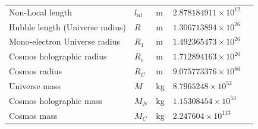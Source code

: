 \documentclass[a4paper,9pt]{article}
\begin{document}
\begin{table}
\begin{tabular}{lllll}
   Non-Local length & $l_{nl}$ & m & $2.878184911 \times 10^{12} $ & \cite{Sanchez2} \\ 
   
    Hubble length (Universe radius) & $R$ & m & $1.306713894 \times 10^{26} $ & \cite{Sanchez2} \\ 
   Mono-electron Universe radius & $R_1$ & m & $1.492365473 \times 10^{26} $ & \cite{Sanchez2} \\ 
   Cosmos holographic radius & $R_e$ & m & $1.712894163 \times 10^{26} $ & \cite{Sanchez2} \\
   Cosmos radius & $ R_C$ & m & $9.075773376 \times 10^{86} $ & \cite{Sanchez2} \\
   Universe mass & $M$ & kg & $8.7965248 \times 10^{52} $ & \cite{Sanchez2} \\ 
   Cosmos holographic mass & $M_N$ & kg & $1.15308454 \times 10^{53} $ & \cite{Sanchez2} \\
 
   Cosmos mass & $M_C$ & kg & $2.247604 \times 10^{113} $ & \cite{Sanchez2} \\ 
   

    \bottomrule
  \end{tabular}
\end{table}




    
\end{document}
